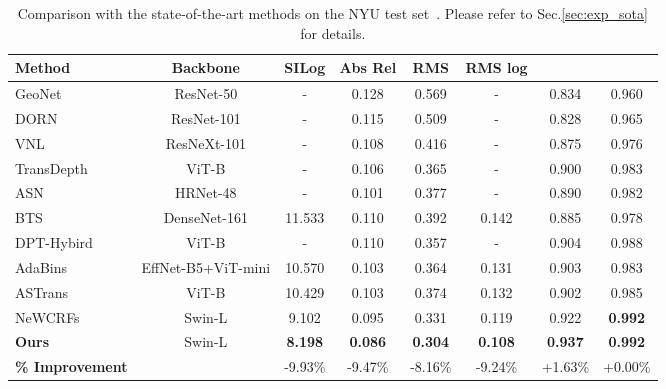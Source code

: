 \documentclass{article} \usepackage{iclr2023_conference, times}
\begin{document}
\begin{table}
\begin{center}
\scriptsize
\caption{\small Comparison with the state-of-the-art methods on the NYU test set~\citep{silberman2012indoor}. Please refer to Sec.\ref{sec:exp_sota} for details. }
\label{tab:nyu_sota}
\setlength\tabcolsep{5.5pt}
\begin{tabular*}{1.0\textwidth}{l@{\extracolsep{\fill}}ccccccc}
\hline
Method & Backbone & SILog  & Abs Rel & RMS & RMS log &    &  \\
\hline
GeoNet~\citep{qi2018geonet} & ResNet-50  & - & 0.128 & 0.569 & - & 0.834 & 0.960 \\
DORN~\citep{fu2018deep} & ResNet-101 & - & 0.115 & 0.509 & - & 0.828 & 0.965 \\
VNL~\citep{yin2019enforcing} & ResNeXt-101 &  - & 0.108 & 0.416 & - & 0.875 & 0.976 \\
TransDepth~\citep{yang2021transformer} & ViT-B  & - & 0.106 & 0.365 & - & 0.900 & 0.983 \\
ASN~\citep{long2021adaptive} & HRNet-48 & - & 0.101 & 0.377 & - & 0.890 & 0.982 \\
BTS~\citep{lee2019big} & DenseNet-161 & 11.533 & 0.110 & 0.392 & 0.142 & 0.885 & 0.978 \\
DPT-Hybird~\citep{ranftl2021vision} & ViT-B & - & 0.110 & 0.357 & - & 0.904 & 0.988 \\
AdaBins~\citep{bhat2021adabins} & EffNet-B5+ViT-mini &  10.570 & 0.103 & 0.364 & 0.131 & 0.903 & 0.983 \\
ASTrans~\citep{chang2021transformer} & ViT-B & 10.429 & 0.103 & 0.374 & 0.132 & 0.902 & 0.985 \\
NeWCRFs~\citep{yuan2022new} & Swin-L & 9.102 & 0.095 & 0.331 & 0.119 & 0.922 & \textbf{0.992} \\
\hline
\textbf{Ours} & Swin-L & \textbf{8.198}  & \textbf{0.086} & \textbf{0.304} & \textbf{0.108} & \textbf{0.937} & \textbf{0.992} \\
\textbf{\% Improvement} & &  \textcolor{ao}{{-9.93\%}} & \textcolor{ao}{{-9.47\%}} & \textcolor{ao}{{-8.16\%}} & \textcolor{ao}{{-9.24\%}} & \textcolor{ao}{{+1.63\%}} & \textcolor{ao}{{+0.00\%}}\\
\hline
\end{tabular*}
\end{center}
\end{table}
\end{document}
